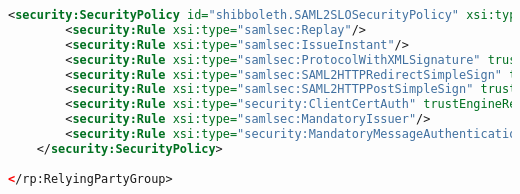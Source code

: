 \begin{lstlisting}[language=xml]
    <security:SecurityPolicy id="shibboleth.SAML2SLOSecurityPolicy" xsi:type="security:SecurityPolicyType">
        <security:Rule xsi:type="samlsec:Replay"/>
        <security:Rule xsi:type="samlsec:IssueInstant"/>
        <security:Rule xsi:type="samlsec:ProtocolWithXMLSignature" trustEngineRef="shibboleth.SignatureTrustEngine"/>
        <security:Rule xsi:type="samlsec:SAML2HTTPRedirectSimpleSign" trustEngineRef="shibboleth.SignatureTrustEngine"/>
        <security:Rule xsi:type="samlsec:SAML2HTTPPostSimpleSign" trustEngineRef="shibboleth.SignatureTrustEngine"/>
        <security:Rule xsi:type="security:ClientCertAuth" trustEngineRef="shibboleth.CredentialTrustEngine"/>
        <security:Rule xsi:type="samlsec:MandatoryIssuer"/>
        <security:Rule xsi:type="security:MandatoryMessageAuthentication"/>
    </security:SecurityPolicy>
    
</rp:RelyingPartyGroup>
\end{lstlisting}

